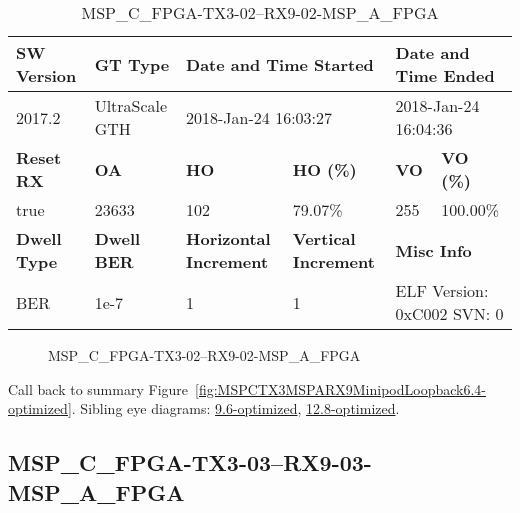 \begin{table}[h]
\centering
\caption{MSP\_C\_FPGA-TX3-02--RX9-02-MSP\_A\_FPGA}
\label{tab:MSPCFPGATX302RX902MSPAFPGA6.4-optimized}
\begin{tabular}{@{}|l|l|l|l|l|l|@{}}
\toprule
\textbf{SW Version}                & \textbf{GT Type}   & \multicolumn{2}{l|}{\textbf{Date and Time Started}}            & \multicolumn{2}{l|}{\textbf{Date and Time Ended}}        \\ \midrule
2017.2                       & UltraScale GTH          & \multicolumn{2}{l|}{2018-Jan-24 16:03:27}                   & \multicolumn{2}{l|}{2018-Jan-24 16:04:36}               \\ \midrule
\textbf{Reset RX}                  & \textbf{OA} & \textbf{HO}   & \textbf{HO (\%)} & \textbf{VO} & \textbf{VO (\%)} \\ \midrule
true & 23633        & 102          & 79.07\%        & 255        & 100.00\%       \\ \midrule
\textbf{Dwell Type}                & \textbf{Dwell BER} & \textbf{Horizontal Increment} & \textbf{Vertical Increment}    & \multicolumn{2}{l|}{\textbf{Misc Info}}                  \\ \midrule
BER                            & 1e-7        & 1        & 1           & \multicolumn{2}{l|}{ELF Version: 0xC002 SVN: 0}                         \\ \bottomrule
\end{tabular}
\end{table}

\begin{figure}[h]
\caption{MSP\_C\_FPGA-TX3-02--RX9-02-MSP\_A\_FPGA} \label{fig:MSPCFPGATX302RX902MSPAFPGA6.4-optimized}
\end{figure}

Call back to summary Figure~\ref{fig:MSPCTX3MSPARX9MinipodLoopback6.4-optimized}.
Sibling eye diagrams: \hyperref[sec:MSPCFPGATX302RX902MSPAFPGA9.6-optimized]{9.6-optimized}, \hyperref[sec:MSPCFPGATX302RX902MSPAFPGA12.8-optimized]{12.8-optimized}.

\clearpage
\newpage


\subsection{MSP\_C\_FPGA-TX3-03--RX9-03-MSP\_A\_FPGA}\label{sec:MSPCFPGATX303RX903MSPAFPGA6.4-optimized}

